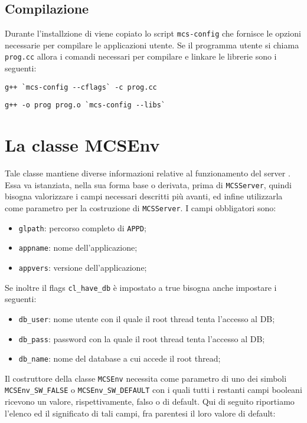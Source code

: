 \subsection{Compilazione}
Durante l'installzione di \mcs viene copiato lo script
\verb|mcs-config| che fornisce le opzioni necessarie per compilare le
applicazioni utente. Se il programma utente si chiama \verb|prog.cc|
allora i comandi necessari per compilare e linkare le librerie sono i
seguenti:

\bigskip
\verb|g++ `mcs-config --cflags` -c prog.cc|

\verb|g++ -o prog prog.o `mcs-config --libs`|
\bigskip


\section{La classe MCSEnv}\label{sec:MCSEnv_fields}
Tale classe mantiene diverse informazioni relative al funzionamento
del server \mcs. Essa va istanziata, nella sua forma base o
derivata, prima di \verb|MCSServer|, quindi bisogna valorizzare i
campi necessari descritti pi\`u avanti, ed infine utilizzarla come
parametro per la costruzione di \verb|MCSServer|. I campi obbligatori
sono:
\begin{itemize}
\item \verb|glpath|: percorso completo di \verb|APPD|;
\item \verb|appname|: nome dell'applicazione;
\item \verb|appvers|: versione dell'applicazione;
\end{itemize}
%
Se inoltre il flags \verb|cl_have_db| \`e impostato a true bisogna
anche impostare i seguenti:
\begin{itemize}
\item \verb|db_user|: nome utente con il quale il root thread tenta
  l'accesso al DB;
\item \verb|db_pass|: password con la quale il root thread tenta
  l'accesso al DB;
\item \verb|db_name|: nome del database a cui accede il root thread;
\end{itemize}
%
Il costruttore della classe \verb|MCSEnv| necessita come parametro di
uno dei simboli \verb|MCSEnv_SW_FALSE| o \verb|MCSEnv_SW_DEFAULT| con
i quali tutti i restanti campi booleani ricevono un valore,
rispettivamente, falso o di default. Qui di seguito riportiamo
l'elenco ed il significato di tali campi, fra parentesi il loro valore
di default:

